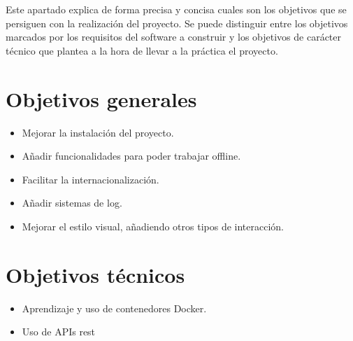 
Este apartado explica de forma precisa y concisa cuales son los objetivos que se persiguen con la realización del proyecto. Se puede distinguir entre los objetivos marcados por los requisitos del software a construir y los objetivos de carácter técnico que plantea a la hora de llevar a la práctica el proyecto.

\section*{Objetivos generales}
\begin{itemize}
    \item Mejorar la instalación del proyecto.
    \item Añadir funcionalidades para poder trabajar offline.
    \item Facilitar la internacionalización.
    \item Añadir sistemas de log.
    \item Mejorar el estilo visual, añadiendo otros tipos de interacción.
\end{itemize}

\section*{Objetivos técnicos}
\begin{itemize}
    \item Aprendizaje y uso de contenedores Docker.
    \item Uso de APIs rest
\end{itemize}
